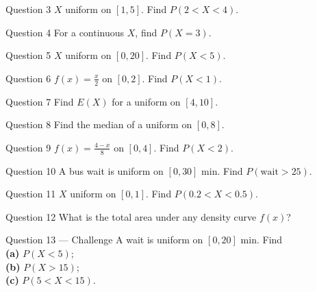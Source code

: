 \documentclass[11pt]{article}
\begin{document}
\begin{qbox}{Question 3}
$X$ uniform on $[1,5]$. Find $P(2<X<4)$.\workspace{2.4cm}
\end{qbox}

\begin{qbox}{Question 4}
For a continuous $X$, find $P(X=3)$.\workspace{2.4cm}
\end{qbox}

\begin{qbox}{Question 5}
$X$ uniform on $[0,20]$. Find $P(X<5)$.\workspace{2.4cm}
\end{qbox}

\begin{qbox}{Question 6}
$f(x)=\tfrac{x}{2}$ on $[0,2]$. Find $P(X<1)$.\workspace{2.4cm}
\end{qbox}

\begin{qbox}{Question 7}
Find $E(X)$ for a uniform on $[4,10]$.\workspace{2.4cm}
\end{qbox}

\begin{qbox}{Question 8}
Find the median of a uniform on $[0,8]$.\workspace{2.4cm}
\end{qbox}

\begin{qbox}{Question 9}
$f(x)=\tfrac{4-x}{8}$ on $[0,4]$. Find $P(X<2)$.\workspace{2.4cm}
\end{qbox}

\begin{qbox}{Question 10}
A bus wait is uniform on $[0,30]$ min. Find $P(\text{wait}>25)$.\workspace{2.4cm}
\end{qbox}

\begin{qbox}{Question 11}
$X$ uniform on $[0,1]$. Find $P(0.2<X<0.5)$.\workspace{2.4cm}
\end{qbox}

\begin{qbox}{Question 12}
What is the total area under any density curve $f(x)$?\workspace{2.4cm}
\end{qbox}

\begin{qbox}{Question 13 --- Challenge}
A wait is uniform on $[0,20]$ min. Find \\ \textbf{(a)} $P(X<5)$; \\ \textbf{(b)} $P(X>15)$; \\ \textbf{(c)} $P(5<X<15)$.\workspace{3cm}
\end{qbox}
\end{document}
